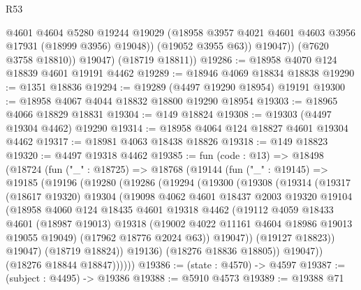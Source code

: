 \begin{lexlean}{R53}
\begin{coremodule}
                  @4601
                  @4604
                  @5280
                  @19244
                  @19029
                  (@18958 @3957 @4021 @4601 @4603 @3956 @17931 (@18999 @3956) @19048))
                (@19052 @3955 @63))
              @19047))
          (@7620 @3758 @18810))
        @19047)
      (@18719 @18811))
@19286 := @18958 @4070 @124 @18839 @4601 @19191 @4462
@19289 := @18946 @4069 @18834 @18838
@19290 := @1351 @18836
@19294 := @19289 (@4497 @19290 @18954) @19191
@19300 := @18958 @4067 @4044 @18832 @18800 @19290 @18954
@19303 := @18965 @4066 @18829 @18831
@19304 := @149 @18824
@19308 := @19303 (@4497 @19304 @4462) @19290
@19314 := @18958 @4064 @124 @18827 @4601 @19304 @4462
@19317 := @18981 @4063 @18438 @18826
@19318 := @149 @18823
@19320 := @4497 @19318 @4462
@19385 := fun (code : @13) =>
  @18498
    (@18724
      (fun ("_" : @18725) =>
      @18768
        (@19144
          (fun ("_" : @19145) =>
          @19185
            (@19196
              (@19280
                (@19286
                  (@19294
                    (@19300
                      (@19308
                        (@19314
                          (@19317
                            (@18617 @19320)
                            @19304
                            (@19098
                              @4062
                              @4601
                              @18437
                              @2003
                              @19320
                              @19104
                              (@18958
                                @4060
                                @124
                                @18435
                                @4601
                                @19318
                                @4462
                                (@19112
                                  @4059
                                  @18433
                                  @4601
                                  (@18987 @19013)
                                  @19318
                                  (@19002 @4022 @11161 @4604 @18986 @19013 @19055 @19049)
                                  (@17962 @18776 @2024 @63))
                                @19047))
                            (@19127 @18823))
                          @19047)
                        (@18719 @18824))
                      @19136)
                    (@18276 @18836 @18805))
                  @19047))
              (@18276 @18844 @18847))))))
@19386 := (state : @4570) -> @4597
@19387 := (subject : @4495) -> @19386
@19388 := @5910 @4573
@19389 := @19388 @71

\end{coremodule}
\end{lexlean}
